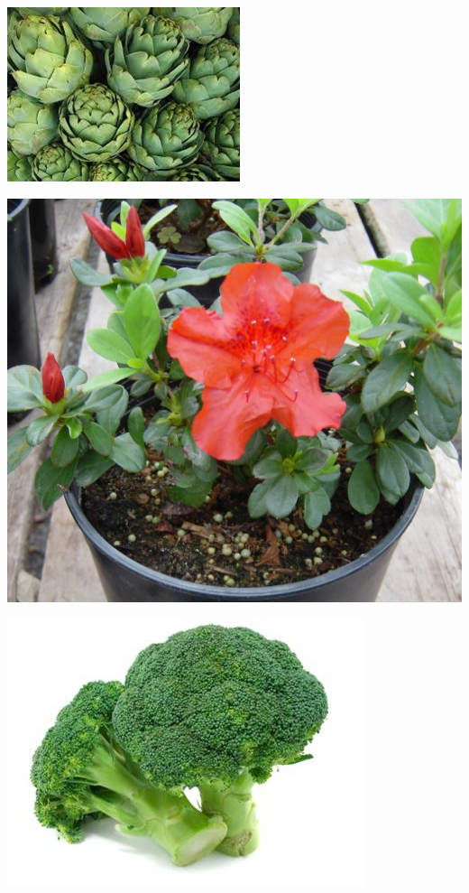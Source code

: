 \documentclass{article}
\begin{document}
\begin{center}
\includegraphics[height=0.925\paperheight]{../Atrichoke.jpg}
\end{center}
\newpage

\begin{center}
\includegraphics[height=0.925\paperheight]{../Azalea.jpg}
\end{center}
\newpage

\begin{center}
\includegraphics[height=0.925\paperheight]{../Broccoli.jpg}
\end{center}
\newpage
\end{document}
